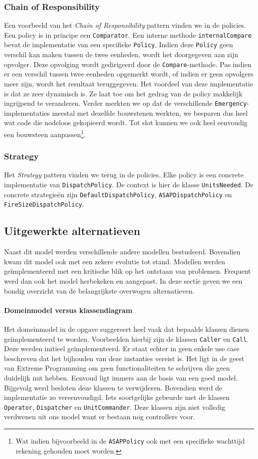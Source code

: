 \subsubsection{Chain of Responsibility}
Een voorbeeld van het \textit{Chain of Responsibility} pattern vinden we in de policies. Een policy is in principe een \texttt{Comparator}. Een interne methode \texttt{internalCompare} bevat de implementatie van een specifieke \texttt{Policy}. Indien deze \texttt{Policy} geen verschil kan maken tussen de twee eenheden, wordt het doorgegeven aan zijn opvolger. Deze opvolging wordt gedirigeerd door de \texttt{Compare}-methode. Pas indien er een verschil tussen twee eenheden opgemerkt wordt, of indien er geen opvolgers meer zijn, wordt het resultaat teruggegeven. Het voordeel van deze implementatie is dat ze zeer dynamisch is. Ze laat toe om het gedrag van de policy makkelijk ingrijpend te veranderen. Verder merkten we op dat de verschillende \texttt{Emergency}-implementaties meestal met dezelfde bouwstenen werkten, we besparen dus heel wat code die nodeloos gekopieerd wordt. Tot slot kunnen we ook heel eenvoudig een bouwsteen aanpassen\footnote{Wat indien bijvoorbeeld in de \texttt{ASAPPolicy} ook met een specifieke wachttijd rekening gehouden moet worden.}.
\subsubsection{Strategy}
Het \textit{Strategy} pattern vinden we terug in de policies. Elke policy is een concrete implementatie van \texttt{DispatchPolicy}. De context is hier de klasse \texttt{UnitsNeeded}. De concrete strategie\"en zijn \texttt{DefaultDispatchPolicy}, \texttt{ASAPDispatchPolicy} en \texttt{FireSizeDispatchPolicy}.
\subsection{Uitgewerkte alternatieven}
Naast dit model werden verschillende andere modellen bestudeerd. Bovendien kwam dit model ook met een zekere evolutie tot stand. Modellen werden ge\"implementeerd met een kritische blik op het ontstaan van problemen. Frequent werd dan ook het model herbekeken en aangepast. In deze sectie geven we een bondig overzicht van de belangrijkste overwogen alternatieven.
\paragraph{Domeinmodel versus klassendiagram}
Het domeinmodel in de opgave suggereert heel vaak dat bepaalde klassen dienen ge\"implementeerd te worden. Voorbeelden hierbij zijn de klassen \texttt{Caller} en \texttt{Call}. Deze werden initieel ge\"implementeerd. Er staat echter in geen enkele use case beschreven dat het bijhouden van deze instanties vereist is. Het ligt in de geest van Extreme Programming om geen functionaliteiten te schrijven die geen duidelijk nut hebben. Eenvoud ligt immers aan de basis van een goed model. Bijgevolg werd besloten deze klassen te verwijderen. Bovendien werd de implementatie zo vereenvoudigd. Iets soortgelijks gebeurde met de klassen \texttt{Operator}, \texttt{Dispatcher} en \texttt{UnitCommander}. Deze klassen zijn niet volledig verdwenen uit ons model want er bestaan nog controllers voor.
